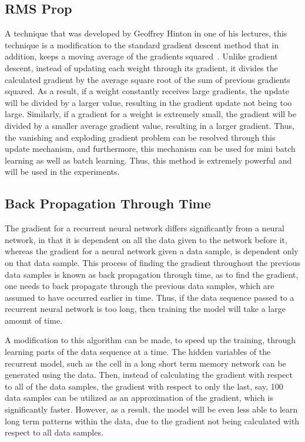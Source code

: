 \documentclass{article}
\begin{document}
\subsection{RMS Prop}
A technique that was developed by Geoffrey Hinton in one of his lectures, this
technique is a modification to the standard gradient descent method that in
addition, keeps a moving average of the gradients squared~\cite{rmsprop}. Unlike
gradient descent, instead of updating each weight through its gradient, it
divides the calculated gradient by the average square root of the sum of
previous gradients squared. As a result, if a weight constantly receives large
gradients, the update will be divided by a larger value, resulting in the
gradient update not being too large. Similarly, if a gradient for a weight is
extremely small, the gradient will be divided by a smaller average gradient
value, resulting in a larger gradient. Thus, the vanishing and exploding
gradient problem can be resolved through this update mechanism, and furthermore,
this mechanism can be used for mini batch learning as well as batch learning.
Thus, this method is extremely powerful and will be used in the experiments.

\subsection{Back Propagation Through Time}
The gradient for a recurrent neural network differs significantly from a neural
network, in that it is dependent on all the data given to the network before it,
whereas the gradient for a neural network given a data sample, is dependent only
on that data sample. This process of finding the gradient throughout the
previous data samples is known as back propagation through time, as to find the
gradient, one needs to back propagate through the previous data samples, which
are assumed to have occurred earlier in time. Thus, if the data sequence passed
to a recurrent neural network is too long, then training the model will take a
large amount of time.

A modification to this algorithm can be made, to speed up the training, through
learning parts of the data sequence at a time. The hidden variables of the
recurrent model, such as the cell in a long short term memory network can be
generated using the data. Then, instead of calculating the gradient with respect
to all of the data samples, the gradient with respect to only the last, say, 100
data samples can be utilized as an approximation of the gradient, which is
significantly faster. However, as a result, the model will be even less able to
learn long term patterns within the data, due to the gradient not being
calculated with respect to all data samples.
\end{document}

